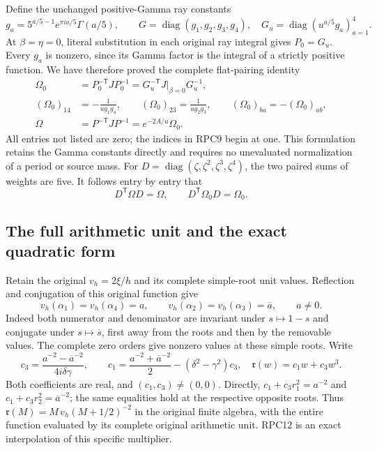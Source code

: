 Define the unchanged positive-Gamma ray constants
\[
 g_a=5^{a/5-1}e^{\pi ia/5}\Gamma(a/5),\qquad
 G=\operatorname{diag}(g_1,g_2,g_3,g_4),\quad
 G_u=\operatorname{diag}(u^{a/5}g_a)_{a=1}^4.
 \tag{RPC8}
\]
At $\beta=\eta=0$, literal substitution in each original ray integral
gives $P_0=G_u$. Every $g_a$ is nonzero, since its Gamma factor is
the integral of a strictly positive function. We have therefore proved
the complete flat-pairing identity
\[
 \begin{split}
 \Omega_0&=P_0^{-\mathsf T}JP_0^{-1}
       =G_u^{-\mathsf T}J\big|_{\beta=0}G_u^{-1},\\
 (\Omega_0)_{14}&=-\frac1{u g_1g_4},\qquad
 (\Omega_0)_{23}=\frac1{u g_2g_3},\qquad
 (\Omega_0)_{ba}=-(\Omega_0)_{ab},\\
 \Omega&=P^{-\mathsf T}JP^{-1}=e^{-2A/u}\Omega_0.
 \end{split}
 \tag{RPC9}
\]
All entries not listed are zero; the indices in RPC9 begin at one.
This formulation retains the Gamma constants directly and requires
no unevaluated normalization of a period or source mass. For
$D=\operatorname{diag}(\zeta,\zeta^2,\zeta^3,\zeta^4)$, the two
paired sums of weights are five. It follows entry by entry that
\[
 D^{\mathsf T}\Omega D=\Omega,
 \qquad D^{\mathsf T}\Omega_0D=\Omega_0.
 \tag{RPC10}
\]

\subsection{The full arithmetic unit and the exact quadratic form}

Retain the original $v_h=2\xi/h$ and its complete simple-root unit
values. Reflection and conjugation of this original function give
\[
 v_h(\alpha_1)=v_h(\alpha_4)=a,\qquad
 v_h(\alpha_2)=v_h(\alpha_3)=\overline a,\qquad a\ne0.
 \tag{RPC11}
\]
Indeed both numerator and denominator are invariant under $s\mapsto1-s$
and conjugate under $s\mapsto\overline s$, first away from the roots
and then by the removable values. The complete zero orders give
nonzero values at these simple roots. Write
\[
 c_3=\frac{a^{-2}-\overline a^{-2}}{4i\delta\gamma},\qquad
 c_1=\frac{a^{-2}+\overline a^{-2}}2-(\delta^2-\gamma^2)c_3,
 \quad \mathfrak r(w)=c_1w+c_3w^3.
 \tag{RPC12}
\]
Both coefficients are real, and $(c_1,c_3)\ne(0,0)$. Directly,
$c_1+c_3r_1^2=a^{-2}$ and $c_1+c_3r_2^2=\overline a^{-2}$;
the same equalities hold at the respective opposite roots. Thus
$\mathfrak r(M)=M\,v_h(M+1/2)^{-2}$ in the original finite algebra, with the
entire function evaluated by its complete original arithmetic unit.
RPC12 is an exact interpolation of this specific multiplier.

